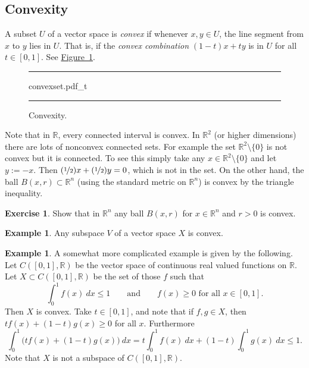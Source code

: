 \documentclass[12pt]{book}
\newenvironment{myfigureht}{%
\begin{figure}[h!t]
\noindent\rule{\textwidth}{0.4pt}\vspace{12pt}\par\centering}%
{\par\noindent\rule{\textwidth}{0.4pt}
\end{figure}}
\newcommand{\R}{{\mathbb{R}}}
\newcommand{\myindex}[1]{#1\index{#1}}
\theoremstyle{plain}
\theoremstyle{remark}
\theoremstyle{definition}
\theoremstyle{exercise}
\newtheorem{exercise}{Exercise}[section]
\theoremstyle{example}
\newtheorem{example}[thm]{Example}
\newcommand{\figureref}[1]{\hyperref[#1]{Figure~\ref*{#1}}}
\begin{document}
\subsection{Convexity}

A subset $U$ of a vector space is \emph{\myindex{convex}}
if whenever $x,y \in U$, the line segment from
$x$ to $y$ lies in $U$.  That is, if the \emph{\myindex{convex combination}}
$(1-t)x+ty$ is in $U$ for all $t \in [0,1]$.  See \figureref{mv:convexcomb}.

\begin{myfigureht}
{convexset.pdf_t}
\caption{Convexity.\label{mv:convexcomb}}
\end{myfigureht}

Note that in $\R$, every connected interval is convex.  In $\R^2$ (or higher
dimensions) there are lots of nonconvex connected sets.  For example
the set $\R^2 \setminus \{0\}$ is not convex but it is connected.  To see
this simply take any $x \in \R^2 \setminus \{0\}$ and let $y:=-x$.
Then $(\nicefrac{1}{2})x + (\nicefrac{1}{2})y = 0$, which is not in the set.
On the other hand, the ball $B(x,r) \subset \R^n$ (using the standard metric
on $\R^n$)
is convex by the triangle inequality.

\begin{exercise}
Show that in $\R^n$ any ball $B(x,r)$ for $x \in \R^n$ and $r > 0$ is
convex.
\end{exercise}

\begin{example}
Any subspace $V$ of a vector space $X$ is convex.
\end{example}

\begin{example}
A somewhat more complicated example is given by the following.  Let
$C([0,1],\R)$ be the vector space of continuous real valued functions on $\R$.
Let $X \subset C([0,1],\R)$ be the set of those $f$ such that
\begin{equation*}
\int_0^1 f(x)~dx \leq 1 \qquad \text{and} \qquad
f(x) \geq 0 \text{ for all $x \in [0,1]$} .
\end{equation*}
Then $X$ is convex.  Take $t \in [0,1]$, and note that if $f,g \in X$,
then $t f(x) + (1-t) g(x) \geq 0$ for all $x$.  Furthermore
\begin{equation*}
\int_0^1 \bigl(tf(x) + (1-t)g(x)\bigr) ~dx
=
t \int_0^1 f(x) ~dx
+ (1-t)\int_0^1 g(x) ~dx \leq 1 .
\end{equation*}
Note that $X$ is not a subspace of $C([0,1],\R)$.
\end{example}
\end{document}
